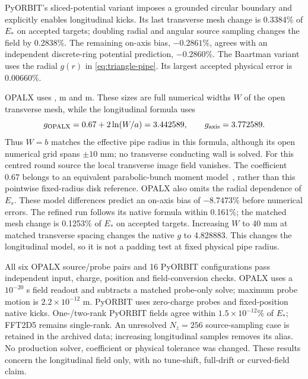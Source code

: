PyORBIT's sliced-potential variant imposes a grounded circular boundary and
explicitly enables longitudinal kicks. Its last transverse mesh change is
0.3384\% of $E_*$ on accepted targets; doubling radial and angular source sampling changes the
field by 0.2838\%. The remaining on-axis bias, $-0.2861\%$, agrees with an
independent discrete-ring potential prediction, $-0.2860\%$. The Baartman
variant uses the radial $g(r)$ in \cref{eq:triangle-pipe}. Its largest
accepted physical error is 0.00660\%.

OPALX uses ,  m and
 m. These sizes are full numerical widths
$W$ of the open transverse mesh, while the longitudinal formula uses
\begin{equation}
 g_{\rm OPALX}=0.67+2\ln(W/a)=3.442589,
 \qquad g_{\rm axis}=3.772589.
 \label{eq:triangle-native}
\end{equation}
Thus $W=b$ matches the effective pipe radius in this formula, although its
open numerical grid spans $\pm10$ mm; no transverse conducting wall is solved.
For this centred round source the local transverse image field vanishes.
The coefficient 0.67 belongs to an equivalent parabolic-bunch moment
model~\cite{oeftiger}, rather than this pointwise fixed-radius disk reference.
OPALX also omits the radial dependence of $E_s$. These model differences
predict an on-axis bias of $-8.7473\%$ before numerical errors. The refined
run follows its native formula within 0.161\%; the matched mesh change is
0.1253\% of $E_*$ on accepted targets. Increasing $W$ to 40 mm at matched transverse spacing
changes the native $g$ to 4.828883. This changes the longitudinal model,
so it is not a padding test at fixed physical pipe radius.

All six OPALX source/probe pairs and 16 PyORBIT configurations pass independent
input, charge, position and field-conversion checks. OPALX uses a
$10^{-20}$ s field readout and subtracts a matched probe-only solve;
maximum probe motion is $2.2\times10^{-12}$ m. PyORBIT uses zero-charge
probes and fixed-position native kicks. One-/two-rank PyORBIT fields agree
within $1.5\times10^{-12}\%$ of $E_*$; FFT2D5 remains single-rank.
An unresolved $N_z=256$ source-sampling case is retained in the archived data;
increasing longitudinal samples removes its alias. No production solver,
coefficient or physical tolerance was changed. These results concern the
longitudinal field only, with no tune-shift, full-drift or curved-field claim.
